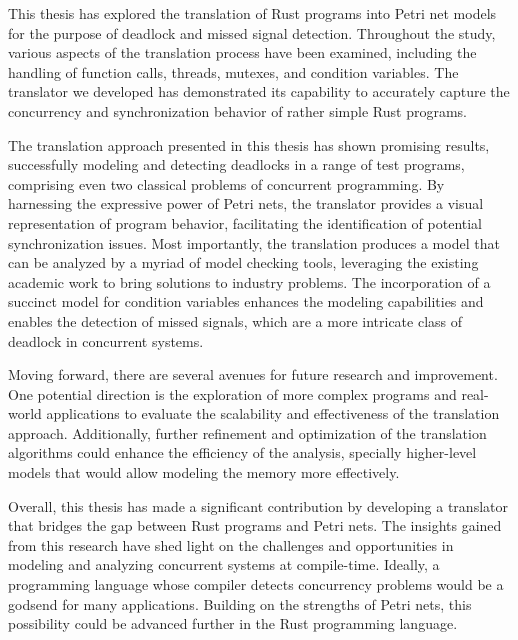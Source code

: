 This thesis has explored the translation of Rust programs into Petri net models
for the purpose of deadlock and missed signal detection.
Throughout the study, various aspects of the translation process have been examined,
including the handling of function calls, threads, mutexes, and condition variables.
The translator we developed has demonstrated its capability
to accurately capture the concurrency and
synchronization behavior of rather simple Rust programs.

The translation approach presented in this thesis has shown promising results,
successfully modeling and detecting deadlocks in a range of test programs,
comprising even two classical problems of concurrent programming.
By harnessing the expressive power of Petri nets,
the translator provides a visual representation of program behavior,
facilitating the identification of potential synchronization issues.
Most importantly, the translation produces a model that can be analyzed
by a myriad of model checking tools,
leveraging the existing academic work to bring solutions to industry problems.
The incorporation of a succinct model for condition variables
enhances the modeling capabilities and enables the detection of missed signals,
which are a more intricate class of deadlock in concurrent systems.

Moving forward, there are several avenues for future research and improvement.
One potential direction is the exploration of more complex programs and real-world applications
to evaluate the scalability and effectiveness of the translation approach.
Additionally, further refinement and optimization of the translation algorithms
could enhance the efficiency of the analysis,
specially higher-level models that would allow modeling the memory more effectively.

Overall, this thesis has made a significant contribution by developing a translator
that bridges the gap between Rust programs and Petri nets.
The insights gained from this research have shed light on the challenges
and opportunities in modeling and analyzing concurrent systems at compile-time.
Ideally, a programming language whose compiler detects concurrency problems
would be a godsend for many applications.
Building on the strengths of Petri nets, this possibility could be advanced
further in the Rust programming language.


